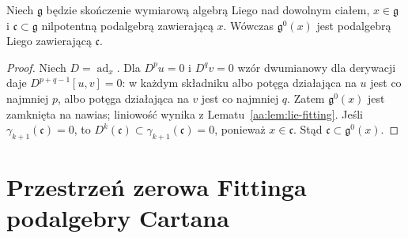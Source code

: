 \begin{lemat}
\label{aa:lem:lie-fitting-subalgebra}
Niech $\mathfrak g$ będzie skończenie wymiarową algebrą Liego nad dowolnym ciałem, $x\in\mathfrak g$ i $\mathfrak c\subset\mathfrak g$ nilpotentną podalgebrą zawierającą $x$. Wówczas $\mathfrak g^0(x)$ jest podalgebrą Liego zawierającą $\mathfrak c$.
\end{lemat}
\begin{proof}
Niech $D=\operatorname{ad}_x$. Dla $D^pu=0$ i $D^qv=0$ wzór dwumianowy dla derywacji daje
$D^{p+q-1}[u,v]=0$: w każdym składniku albo potęga działająca na $u$ jest co najmniej $p$, albo potęga działająca na $v$ jest co najmniej $q$. Zatem $\mathfrak g^0(x)$ jest zamknięta na nawias; liniowość wynika z Lematu~\ref{aa:lem:lie-fitting}. Jeśli $\gamma_{k+1}(\mathfrak c)=0$, to $D^k(\mathfrak c)\subset\gamma_{k+1}(\mathfrak c)=0$, ponieważ $x\in\mathfrak c$. Stąd $\mathfrak c\subset\mathfrak g^0(x)$.
\end{proof}

\section{Przestrzeń zerowa Fittinga podalgebry Cartana}

